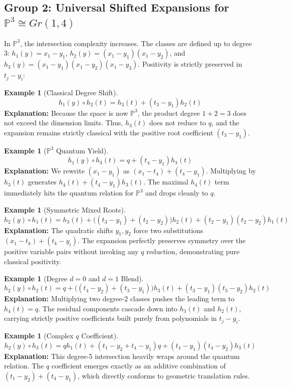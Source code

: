 \documentclass{amsart}
\theoremstyle{definition}
\newtheorem{example}[theorem]{Example}
\begin{document}
\subsection*{Group 2: Universal Shifted Expansions for $\mathbb{P}^3 \cong Gr(1,4)$}
In $\mathbb{P}^3$, the intersection complexity increases. The classes are defined up to degree 3: $h_1(y) = x_1 - y_1$, $h_2(y) = (x_1 - y_1)(x_1 - y_2)$, and $h_3(y) = (x_1 - y_1)(x_1 - y_2)(x_1 - y_3)$. Positivity is strictly preserved in $t_j - y_i$:
\begin{example}[Classical Degree Shift]
$$ h_1(y) \circ h_2(t) = h_3(t) + (t_3 - y_1) h_2(t) $$
\textbf{Explanation:} Because the space is now $\mathbb{P}^3$, the product degree $1+2=3$ does not exceed the dimension limits. Thus, $h_3(t)$ does not reduce to $q$, and the expansion remains strictly classical with the positive root coefficient $(t_3 - y_1)$.
\end{example}

\begin{example}[$\mathbb{P}^3$ Quantum Yield]
$$ h_1(y) \circ h_3(t) = q + (t_4 - y_1) h_3(t) $$
\textbf{Explanation:} We rewrite $(x_1 - y_1)$ as $(x_1 - t_4) + (t_4 - y_1)$. Multiplying by $h_3(t)$ generates $h_4(t) + (t_4 - y_1) h_3(t)$. The maximal $h_4(t)$ term immediately hits the quantum relation for $\mathbb{P}^3$ and drops cleanly to $q$.
\end{example}

\begin{example}[Symmetric Mixed Roots]
$$ h_2(y) \circ h_1(t) = h_3(t) + \big((t_3 - y_1) + (t_2 - y_2)\big) h_2(t) + (t_2 - y_1)(t_2 - y_2) h_1(t) $$
\textbf{Explanation:} The quadratic shifts $y_1, y_2$ force two substitutions $(x_1 - t_k) + (t_k - y_i)$. The expansion perfectly preserves symmetry over the positive variable pairs without invoking any $q$ reduction, demonstrating pure classical positivity.
\end{example}

\begin{example}[Degree $d=0$ and $d=1$ Blend]
$$ h_2(y) \circ h_2(t) = q + \big((t_4 - y_2) + (t_3 - y_1)\big) h_3(t) + (t_3 - y_1)(t_3 - y_2) h_2(t) $$
\textbf{Explanation:} Multiplying two degree-2 classes pushes the leading term to $h_4(t) = q$. The residual components cascade down into $h_3(t)$ and $h_2(t)$, carrying strictly positive coefficients built purely from polynomials in $t_j - y_i$.
\end{example}

\begin{example}[Complex $q$ Coefficient]
$$ h_2(y) \circ h_3(t) = q h_1(t) + (t_1 - y_2 + t_4 - y_1) q + (t_4 - y_1)(t_4 - y_2) h_3(t) $$
\textbf{Explanation:} This degree-5 intersection heavily wraps around the quantum relation. The $q$ coefficient emerges exactly as an additive combination of $(t_1 - y_2) + (t_4 - y_1)$, which directly conforms to geometric translation rules.
\end{example}
\end{document}
